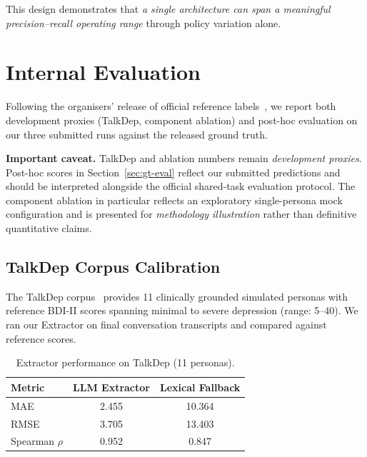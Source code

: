 \documentclass[]{ceurart}
\begin{document}
This design demonstrates that \emph{a single architecture can span a meaningful precision--recall operating range} through policy variation alone.


\section{Internal Evaluation}\label{sec:eval}

Following the organisers' release of official reference labels~\cite{PerezEtAl2026eRiskWorkingNotes}, we report both development proxies (TalkDep, component ablation) and post-hoc evaluation on our three submitted runs against the released ground truth.

\textbf{Important caveat.}
TalkDep and ablation numbers remain \emph{development proxies}.
Post-hoc scores in Section~\ref{sec:gt-eval} reflect our submitted predictions and should be interpreted alongside the official shared-task evaluation protocol.
The component ablation in particular reflects an exploratory single-persona mock configuration and is presented for \emph{methodology illustration} rather than definitive quantitative claims.

\subsection{TalkDep Corpus Calibration}\label{sec:talkdep}

The TalkDep corpus~\cite{Perez2025talkdep} provides 11 clinically grounded simulated personas with reference BDI-II scores spanning minimal to severe depression (range: 5--40).
We ran our Extractor on final conversation transcripts and compared against reference scores.

\begin{table}[t]
\caption{Extractor performance on TalkDep (11 personas).}
\label{tab:talkdep}
\centering
\small
\begin{tabular}{lcc}
\toprule
\textbf{Metric} & \textbf{LLM Extractor} & \textbf{Lexical Fallback} \\
\midrule
MAE                & 2.455 & 10.364 \\
RMSE               & 3.705 & 13.403 \\
Spearman $\rho$    & 0.952 & 0.847 \\
\bottomrule
\end{tabular}
\end{table}
\end{document}
